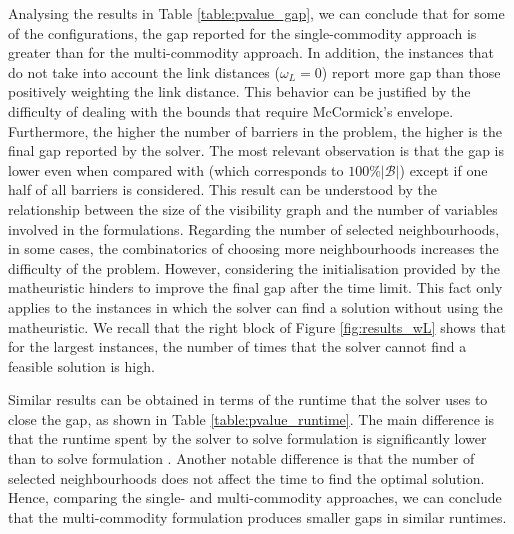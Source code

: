 \documentclass[a4paper,  review, authoryear, 1p.]{elsarticle}
\newcommand{\KMPHN}{{\sf{H-KMPHN}}}
\newcommand{\KMPN}{{\sf{H-KMPN}\xspace }}
\begin{document}
		
		Analysing the results in Table \ref{table:pvalue_gap}, we can conclude that for some of the configurations, the gap reported for the single-commodity approach is greater than for the multi-commodity approach. In addition, the instances that do not take into account the link distances ($\omega_L=0$) report more gap than those positively weighting the link distance. This behavior can be justified by the difficulty of dealing with the bounds that require McCormick's envelope. Furthermore, the higher the number of barriers in the problem, the higher is the final gap reported by the solver. The most relevant observation is that the gap is lower even when compared with \KMPN\xspace (which corresponds to $100\% |\mathcal{B}|$) except if one half of all barriers is considered. This result can be understood by the relationship between the size of the visibility graph and the number of variables involved in the formulations. Regarding the number of selected neighbourhoods, in some cases, the combinatorics of choosing more neighbourhoods increases the difficulty of the problem. However, considering the initialisation provided by the matheuristic hinders to improve the final gap after the time limit. This fact only applies to the instances in which the solver can find a solution without using the matheuristic. We recall that the right block of Figure \ref{fig:results_wL} shows that for the largest instances, the number of times that the solver cannot find a feasible solution is high.
		
		Similar results can be obtained in terms of the runtime that the solver uses to close the gap, as shown in Table \ref{table:pvalue_runtime}. The main difference is that the runtime spent by the solver to solve formulation \KMPN \xspace is significantly lower than to solve formulation \KMPHN. Another notable difference is that the number of selected neighbourhoods does not affect the time to find the optimal solution. Hence, comparing the single- and multi-commodity approaches, we can conclude that the multi-commodity formulation produces smaller gaps in similar runtimes. 
		
\end{document}
